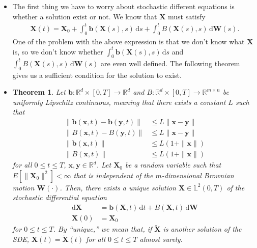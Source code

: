 \documentclass[10pt]{article}
\newtheorem{theorem}[lemma]{Theorem}
\newcommand{\dee}{\mathrm{d}}
\newcommand{\ve}[1]{\mathbf{#1}}
\newcommand{\Real}{\mathbb{R}}
\begin{document}
\begin{itemize}
  \item The first thing we have to worry about stochastic different equations is whether a solution exist or not. We know that $\ve{X}$ must satisfy
  \begin{align*}
    \ve{X}(t) = \ve{X}_0 + \int_0^t\ve{b}(\ve{X}(s), s)\, \dee s + \int_0^t B(\ve{X}(s), s)\, \dee\ve{W}(s).
  \end{align*}
  One of the problem with the above expression is that we don't know what $\ve{X}$ is, so we don't know whether $\int_0^t\ve{b}(\ve{X}(s), s)\, \dee s$ and $\int_0^t B(\ve{X}(s), s)\, \dee\ve{W}(s)$ are even well defined. The following theorem gives us a sufficient condition for the solution to exist.

  \item \begin{theorem} \label{theorem:existence-and-uniqueness-of-solution}
    Let $\ve{b}: \Real^d \times [0,T] \rightarrow \Real^d$ and $B: \Real^d \times [0,T] \rightarrow \Real^{m \times n}$ be uniformly Lipschitz continuous, meaning that there exists a constant $L$ such that
    \begin{align*}
      \| \ve{b}(\ve{x},t) - \ve{b}(\ve{y},t) \| &\leq L\| \ve{x} - \ve{y} \| \\
      \| B(\ve{x},t) - B(\ve{y},t) \| &\leq L\| \ve{x} - \ve{y} \| \\
      \| \ve{b}(\ve{x},t) \| &\leq L(1 + \| \ve{x} \|) \\
      \| B(\ve{x},t) \| &\leq L(1 + \| \ve{x} \|)
    \end{align*}
    for all $0 \leq t \leq T$, $\ve{x}, \ve{y} \in \Real^d$. Let $\ve{X}_0$ be a random variable such that $E[\| \ve{X}_0\|^2] < \infty$ that is independent of the $m$-dimensional Brownian motion $\ve{W}(\cdot)$. Then, there exists a unique solution $\ve{X} \in \mathbb{L}^2(0,T)$ of the stochastic differential equation
    \begin{align*}
      \dee \ve{X} &= \ve{b}(\ve{X},t)\, \dee t + B(\ve{X}, t)\, \dee\ve{W} \\
      \ve{X}(0) &= \ve{X}_0
    \end{align*}
    for $0 \leq t \leq T$. By ``unique,'' we mean that, if $\widetilde{\ve{X}}$ is another solution of the SDE, $\ve{X}(t) = \widetilde{\ve{X}}(t)$ for all $0 \leq t \leq T$ almost surely.
  \end{theorem}


\end{itemize}
\end{document}
